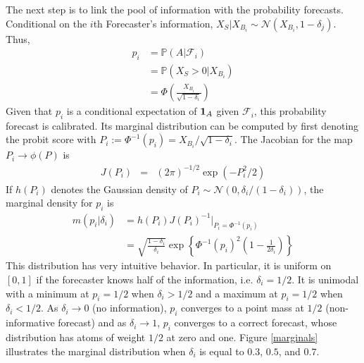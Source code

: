 \documentclass[11pt]{article}
\renewcommand{\P}{\mathbb{P}}
\theoremstyle{definition}
\theoremstyle{definition}
\def\one{{\bf 1}}
\def\P{{\mathbb P}}
\begin{document}
The next step is
to link the pool of information with the probability forecasts. Conditional on the $i$th Forecaster's information, $X_S | X_{B_i} \sim \mathcal{N}\left(X_{B_i}, 1-\delta_j\right)$. Thus,
\begin{align*}
p_i &= \P\left(A | \mathcal{F}_{i}\right)\\
 &= \P\left(X_S > 0 | X_{B_i}\right)\\
 &= \Phi\left( \frac{X_{B_i}}{\sqrt{1-\delta_i}}\right) 
\end{align*}
Given that $p_i$ is a conditional expectation of $\one_A$ given $\mathcal{F}_i$, this probability forecast is calibrated. Its marginal distribution can be computed by first denoting the probit score with $P_{i} := \Phi^{-1}(p_i) = X_{B_i}/\sqrt{1-\delta_i}$. The Jacobian for the map $P_{i} \to \phi(P)$ is
\begin{eqnarray*}
J(P_i) &=& (2\pi)^{-1/2} \exp \left( - P_i^2/2   \right) 
\end{eqnarray*}
If $h(P_i)$ denotes the Gaussian density of $P_i \sim \mathcal{N}\left(0, \delta_i / (1-\delta_i)\right)$,
the marginal density for $p_i$ is
\begin{align*}
 m\left(p_i | \delta_i \right) &= h(P_i) J(P_i)^{-1} \bigg|_{P_i = \Phi^{-1}(p_i)}\\
&= \sqrt{\frac{1-\delta_i}{\delta_i}} \exp 
   \left\{ \Phi^{-1}(p_i)^2 \left(1-\frac{1}{2 \delta_i} \right) \right\} 
\end{align*}
This distribution has very intuitive behavior. In particular, it is uniform on $[0,1]$ if the forecaster knows half of the
information, i.e. $\delta_i = 1/2$.  It is
unimodal with a minimum at $p_i = 1/2$ when $\delta_i > 1/2$ and a
maximum at $p_i = 1/2$ when $\delta_i < 1/2$.  As $\delta_i \to 0$ (no
information), $p_i$ converges to a point mass at $1/2$
(non-informative forecast) and as $\delta_i \to 1$, $p_i$ converges to
a correct forecast, whose distribution has atoms of weight $1/2$ at
zero and one. Figure \ref{marginals} illustrates the marginal
distribution when $\delta_i$ is equal to $0.3$, $0.5$, and $0.7$.
\end{document}
